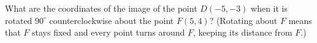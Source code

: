 What are the coordinates of the image of the point $D(-5,-3)$ when it is rotated $90^\circ$ counterclockwise about the point $F(5,4)$? (Rotating about $F$ means that $F$ stays fixed and every point turns around $F$, keeping its distance from $F$.)
